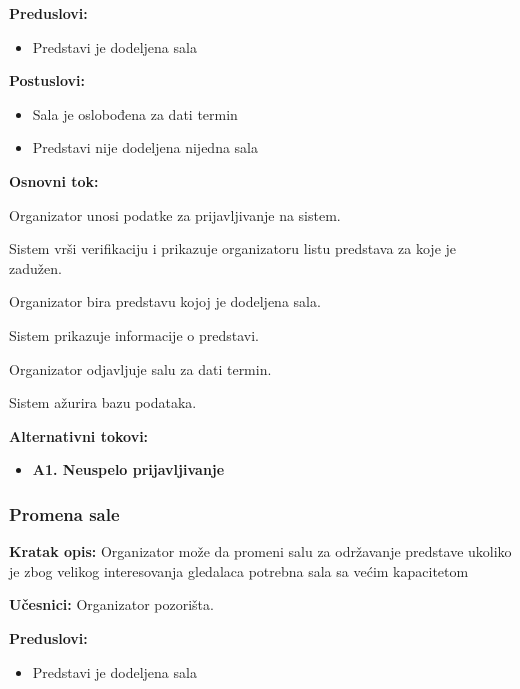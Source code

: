 \documentclass[a4paper]{article}
\begin{document}
\noindent\textbf{Preduslovi:}
  \begin{itemize}
    \item Predstavi je dodeljena sala
  \end{itemize}

\noindent\textbf{Postuslovi:} 
  \begin{itemize}
    \item Sala je oslobođena za dati termin
    \item Predstavi nije dodeljena nijedna sala
  \end{itemize}

\noindent\textbf{Osnovni tok:}
  \begin{legal}
   \item Organizator unosi podatke za prijavljivanje na sistem.
    \item Sistem vrši verifikaciju i prikazuje organizatoru listu predstava za koje je zadužen.
    \item Organizator bira predstavu kojoj je dodeljena sala.
    \item Sistem prikazuje informacije o predstavi.
    \item Organizator odjavljuje salu za dati termin.
    \item Sistem ažurira bazu podataka.
  \end{legal}

\noindent\textbf{Alternativni tokovi:} 
\begin{itemize}
 \item \textbf{A1. Neuspelo prijavljivanje} 
  
\end{itemize}


\subsubsection{Promena sale}
\noindent\textbf{Kratak opis:} Organizator može da promeni salu za održavanje predstave ukoliko je zbog velikog interesovanja gledalaca potrebna sala sa većim kapacitetom

\noindent\textbf{Učesnici:} Organizator pozorišta.

\noindent\textbf{Preduslovi:}
  \begin{itemize}
    \item Predstavi je dodeljena sala
  \end{itemize}
\end{document}
